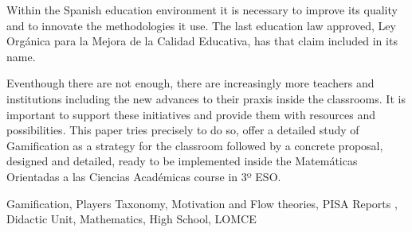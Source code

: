 
Within the Spanish education environment it is necessary to improve its quality and to innovate the methodologies it use.
%
The last education law approved, Ley Orgánica para la Mejora de la Calidad Educativa, has that claim included in its name.

Eventhough there are not enough, there are increasingly more teachers and institutions including the new advances to their praxis inside the classrooms.
%
It is important to support these initiatives and provide them with resources and possibilities.  
%
This paper tries precisely to do so, offer a detailed study of Gamification as a strategy for the classroom followed by a concrete proposal, designed and detailed, ready to be implemented inside the Matemáticas Orientadas a las Ciencias Académicas course in 3º ESO.


\begin{keywordsEn}
Gamification, Players Taxonomy, Motivation and Flow theories, PISA Reports , Didactic Unit, Mathematics, High School, LOMCE
\end{keywordsEn}
